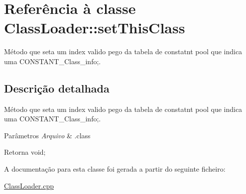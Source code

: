 \hypertarget{class_class_loader_1_1set_this_class}{}\section{Referência à classe Class\+Loader\+:\+:set\+This\+Class}
\label{class_class_loader_1_1set_this_class}


Método que seta um index valido pego da tabela de constatnt pool que indica uma C\+O\+N\+S\+T\+A\+N\+T\+\_\+\+Class\+\_\+info;.  




\subsection{Descrição detalhada}
Método que seta um index valido pego da tabela de constatnt pool que indica uma C\+O\+N\+S\+T\+A\+N\+T\+\_\+\+Class\+\_\+info;. 


\begin{DoxyParams}{Parâmetros}
{\em Arquivo} & .class \\
\hline
\end{DoxyParams}
\begin{DoxyReturn}{Retorna}
void; 
\end{DoxyReturn}


A documentação para esta classe foi gerada a partir do seguinte ficheiro\+:\begin{DoxyCompactItemize}
\item 
\hyperlink{_class_loader_8cpp}{Class\+Loader.\+cpp}\end{DoxyCompactItemize}
